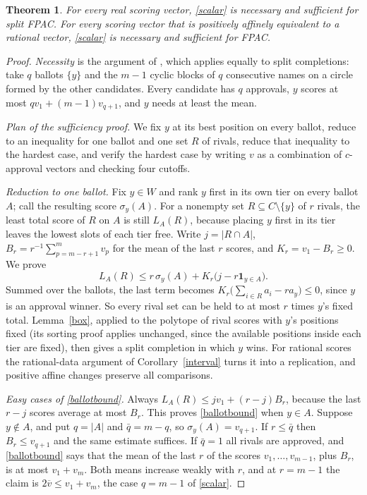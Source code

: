 \documentclass[11pt,a4paper]{article}
\newtheorem{theorem}{Theorem}
\theoremstyle{definition}
\theoremstyle{remark}
\newcommand{\one}{\mathbf 1}
\begin{document}
\begin{theorem}\label{rationalfpac}
For every real scoring vector, \eqref{scalar} is necessary and sufficient for split FPAC. For every scoring vector that is positively affinely equivalent to a rational vector, \eqref{scalar} is necessary and sufficient for FPAC.
\end{theorem}
\begin{proof}
\emph{Necessity} is the argument of \cite[Lemma~2]{tlz}, which applies equally to split completions: take $q$ ballots $\{y\}$ and the $m-1$ cyclic blocks of $q$ consecutive names on a circle formed by the other candidates. Every candidate has $q$ approvals, $y$ scores at most $qv_1+(m-1)v_{q+1}$, and $y$ needs at least the mean.

\emph{Plan of the sufficiency proof.} We fix $y$ at its best position on every ballot, reduce to an inequality for one ballot and one set $R$ of rivals, reduce that inequality to the hardest case, and verify the hardest case by writing $v$ as a combination of $c$-approval vectors and checking four cutoffs.

\emph{Reduction to one ballot.} Fix $y\in W$ and rank $y$ first in its own tier on every ballot $A$; call the resulting score $\sigma_y(A)$. For a nonempty set $R\subseteq C\setminus\{y\}$ of $r$ rivals, the least total score of $R$ on $A$ is still $L_A(R)$, because placing $y$ first in its tier leaves the lowest slots of each tier free. Write $j=|R\cap A|$, $B_r=r^{-1}\sum_{p=m-r+1}^mv_p$ for the mean of the last $r$ scores, and $K_r=v_1-B_r\ge0$. We prove
\begin{equation}
 L_A(R)\le r\,\sigma_y(A)+K_r\bigl(j-r\one_{y\in A}\bigr).\label{ballotbound}
\end{equation}
Summed over the ballots, the last term becomes $K_r\bigl(\sum_{i\in R}a_i-ra_y\bigr)\le0$, since $y$ is an approval winner. So every rival set can be held to at most $r$ times $y$'s fixed total. Lemma~\ref{box}, applied to the polytope of rival scores with $y$'s positions fixed (its sorting proof applies unchanged, since the available positions inside each tier are fixed), then gives a split completion in which $y$ wins. For rational scores the rational-data argument of Corollary~\ref{interval} turns it into a replication, and positive affine changes preserve all comparisons.

\emph{Easy cases of \eqref{ballotbound}.} Always $L_A(R)\le jv_1+(r-j)B_r$, because the last $r-j$ scores average at most $B_r$. This proves \eqref{ballotbound} when $y\in A$. Suppose $y\notin A$, and put $q=|A|$ and $\bar q=m-q$, so $\sigma_y(A)=v_{q+1}$. If $r\le\bar q$ then $B_r\le v_{q+1}$ and the same estimate suffices. If $\bar q=1$ all rivals are approved, and \eqref{ballotbound} says that the mean of the last $r$ of the scores $v_1,\ldots,v_{m-1}$, plus $B_r$, is at most $v_1+v_m$. Both means increase weakly with $r$, and at $r=m-1$ the claim is $2\overline v\le v_1+v_m$, the case $q=m-1$ of \eqref{scalar}.


\end{proof}
\end{document}
